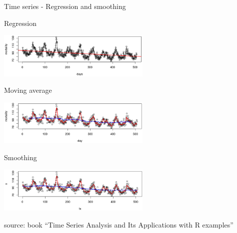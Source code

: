 \documentclass[8pt,ignorenonframetext,]{beamer}
\newcommand{\columnsend}{\end{columns}}
\begin{document}

\begin{frame}{Time series - Regression and smoothing}

Regression

\includegraphics[width=0.55000\textwidth]{imgPres/ts_regression.png}

Moving average

\includegraphics[width=0.55000\textwidth]{imgPres/ts_MA.png}

Smoothing

\includegraphics[width=0.55000\textwidth]{imgPres/ts_KS.png}

source: book ``Time Series Analysis and Its Applications with R
examples''

\end{frame}
\end{document}
